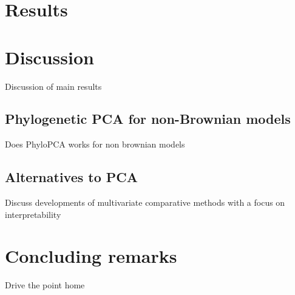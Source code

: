\documentclass[a4paper,12pt]{article}
\begin{document}
\section{Results}

\section{Discussion}

Discussion of main results

\subsection{Phylogenetic PCA for non-Brownian models}
Does PhyloPCA works for non brownian models

\subsection{Alternatives to PCA}
Discuss developments of multivariate comparative methods with a focus on interpretability

\section{Concluding remarks}
Drive the point home



\end{document}
